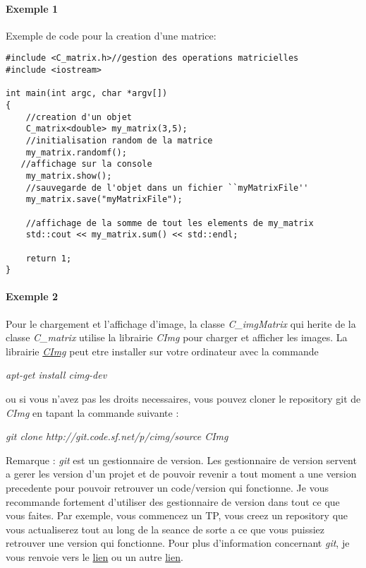 \documentclass[10pt,a4paper]{article}
\begin{document}
\paragraph{Exemple 1}
Exemple de code pour la creation d'une matrice: 
\begin{verbatim}
#include <C_matrix.h>//gestion des operations matricielles
#include <iostream>

int main(int argc, char *argv[])
{
    //creation d'un objet
    C_matrix<double> my_matrix(3,5);
    //initialisation random de la matrice
    my_matrix.randomf();
   //affichage sur la console
    my_matrix.show();
    //sauvegarde de l'objet dans un fichier ``myMatrixFile''
    my_matrix.save("myMatrixFile");

    //affichage de la somme de tout les elements de my_matrix
    std::cout << my_matrix.sum() << std::endl;

    return 1;
}
\end{verbatim}

\paragraph{Exemple 2} Pour le chargement et l'affichage d'image, la classe \textit{C\_imgMatrix} qui herite de la classe \textit{C\_matrix} utilise la librairie \textit{CImg} pour charger et afficher les images. La librairie \href{http://cimg.sourceforge.net/reference/group__cimg__tutorial.html}{\textit{CImg}} peut etre installer sur votre ordinateur avec la commande 
\begin{center}
	\textit{apt-get install cimg-dev}
\end{center}
ou si vous n'avez pas les droits necessaires, vous pouvez cloner le repository git de \textit{CImg} en tapant la commande suivante : 
\begin{center}
	\textit{git clone http://git.code.sf.net/p/cimg/source CImg}
\end{center}
Remarque : \textit{git} est un gestionnaire de version. Les gestionnaire de version servent a gerer les version d'un projet et de pouvoir revenir a tout moment a une version precedente pour pouvoir retrouver un code/version qui fonctionne. Je vous recommande fortement d'utiliser des gestionnaire de version dans tout ce que vous faites. Par exemple, vous commencez un TP, vous creez un repository que vous actualiserez tout au long de la seance de sorte a ce que vous puissiez retrouver une version qui fonctionne. Pour plus d'information concernant \textit{git}, je vous renvoie vers le \href{https://github.com/}{lien} ou un autre \href{http://rogerdudler.github.io/git-guide/}{lien}.
\end{document}
